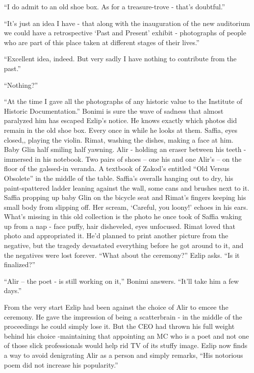 \documentclass[twoside,11pt]{book}
\begin{document}
``I do admit to an old shoe box. As for a treasure-trove - that's doubtful.''

``It's just an idea I have - that along with the inauguration of the new auditorium we could have a
retrospective `Past and Present' exhibit - photographs of people who are part of this place taken at different stages
of their lives.''

``Excellent idea, indeed. But very sadly I have nothing to contribute from the past.''

``Nothing?''

``At the time I gave all the photographs of any historic value to the Institute of Historic
Documentation.'' Bonimi is sure the wave of sadness that almost paralyzed him has escaped Ezlip's
notice. He knows exactly which photos did remain in the old shoe box. Every once in while he looks at them. Saffia,
eyes closed,, playing the violin. Rimat, washing the dishes, making a face at him. Baby Glin half smiling half yawning.
Alir - holding an eraser between his teeth - immersed in his notebook. Two pairs of shoes -- one his
and one Alir's -- on the floor of the galssed-in veranda. A textbook of Zakod's entitled ``Old Versus
Obsolete'' in the middle of the table. Saffia's overalls hanging out to dry, his paint-spattered ladder
leaning against the wall, some cans and brushes next to it.  Saffia propping up baby Glin on the bicycle seat
and Rimat's fingers keeping his small body from slipping off.  Her scream, `Careful, you loony!' echoes in his ears.
What's missing in this old collection is the photo he once took of Saffia waking up from a nap - face puffy, hair
disheveled, eyes
unfocused.  Rimat loved that photo and appropriated it. He'd planned to print another picture from the negative, but
the tragedy devastated everything before he got around to it, and the negatives were lost forever. ``What
about the ceremony?'' Ezlip asks. ``Is it finalized?''

``Alir -- the poet - is still working on it,'' Bonimi answers. ``It'll take him a
few days.''

From the very start Ezlip had been against the choice of Alir to emcee the ceremony. He gave the impression of being a
scatterbrain - in the middle of the proceedings he could simply lose it. But the CEO had thrown his full weight behind
his choice -maintaining that appointing an MC who is a poet and not one of those slick professionals would help rid TV
of its stuffy image.  Ezlip now finds a way to avoid denigrating Alir as a person and simply remarks,
 ``His notorious poem did not increase his popularity.''
\end{document}
